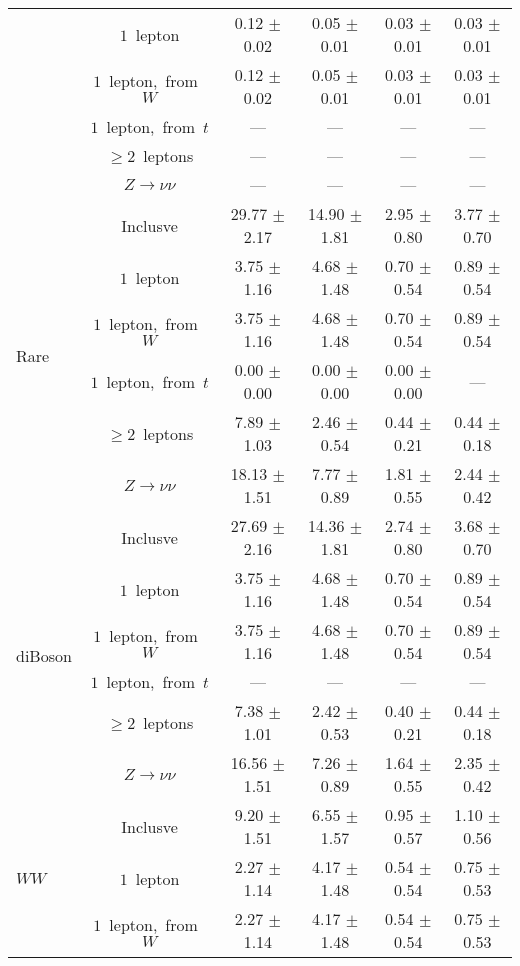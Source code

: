 \documentclass{article}
\begin{document}
\begin{longtable}{|l|c|c|c|c|c|}
 & $1$~lepton  & 0.12 $\pm$ 0.02  & 0.05 $\pm$ 0.01  & 0.03 $\pm$ 0.01  & 0.03 $\pm$ 0.01 \\* 
 & $1$~lepton,~from~$W$  & 0.12 $\pm$ 0.02  & 0.05 $\pm$ 0.01  & 0.03 $\pm$ 0.01  & 0.03 $\pm$ 0.01 \\* 
 & $1$~lepton,~from~$t$  & ---  & ---  & ---  & --- \\* 
 & $\ge2$~leptons  & ---  & ---  & ---  & --- \\* 
 & $Z\rightarrow\nu\nu$  & ---  & ---  & ---  & --- \\* 
\hline 
\multirow{6}{*}{Rare} & Inclusve  & 29.77 $\pm$ 2.17  & 14.90 $\pm$ 1.81  & 2.95 $\pm$ 0.80  & 3.77 $\pm$ 0.70 \\* 
 & $1$~lepton  & 3.75 $\pm$ 1.16  & 4.68 $\pm$ 1.48  & 0.70 $\pm$ 0.54  & 0.89 $\pm$ 0.54 \\* 
 & $1$~lepton,~from~$W$  & 3.75 $\pm$ 1.16  & 4.68 $\pm$ 1.48  & 0.70 $\pm$ 0.54  & 0.89 $\pm$ 0.54 \\* 
 & $1$~lepton,~from~$t$  & 0.00 $\pm$ 0.00  & 0.00 $\pm$ 0.00  & 0.00 $\pm$ 0.00  & --- \\* 
 & $\ge2$~leptons  & 7.89 $\pm$ 1.03  & 2.46 $\pm$ 0.54  & 0.44 $\pm$ 0.21  & 0.44 $\pm$ 0.18 \\* 
 & $Z\rightarrow\nu\nu$  & 18.13 $\pm$ 1.51  & 7.77 $\pm$ 0.89  & 1.81 $\pm$ 0.55  & 2.44 $\pm$ 0.42 \\* 
\hline 
\multirow{6}{*}{diBoson} & Inclusve  & 27.69 $\pm$ 2.16  & 14.36 $\pm$ 1.81  & 2.74 $\pm$ 0.80  & 3.68 $\pm$ 0.70 \\* 
 & $1$~lepton  & 3.75 $\pm$ 1.16  & 4.68 $\pm$ 1.48  & 0.70 $\pm$ 0.54  & 0.89 $\pm$ 0.54 \\* 
 & $1$~lepton,~from~$W$  & 3.75 $\pm$ 1.16  & 4.68 $\pm$ 1.48  & 0.70 $\pm$ 0.54  & 0.89 $\pm$ 0.54 \\* 
 & $1$~lepton,~from~$t$  & ---  & ---  & ---  & --- \\* 
 & $\ge2$~leptons  & 7.38 $\pm$ 1.01  & 2.42 $\pm$ 0.53  & 0.40 $\pm$ 0.21  & 0.44 $\pm$ 0.18 \\* 
 & $Z\rightarrow\nu\nu$  & 16.56 $\pm$ 1.51  & 7.26 $\pm$ 0.89  & 1.64 $\pm$ 0.55  & 2.35 $\pm$ 0.42 \\* 
\hline 
\multirow{6}{*}{$WW$} & Inclusve  & 9.20 $\pm$ 1.51  & 6.55 $\pm$ 1.57  & 0.95 $\pm$ 0.57  & 1.10 $\pm$ 0.56 \\* 
 & $1$~lepton  & 2.27 $\pm$ 1.14  & 4.17 $\pm$ 1.48  & 0.54 $\pm$ 0.54  & 0.75 $\pm$ 0.53 \\* 
 & $1$~lepton,~from~$W$  & 2.27 $\pm$ 1.14  & 4.17 $\pm$ 1.48  & 0.54 $\pm$ 0.54  & 0.75 $\pm$ 0.53 \\* 

\end{longtable}
\end{document}
